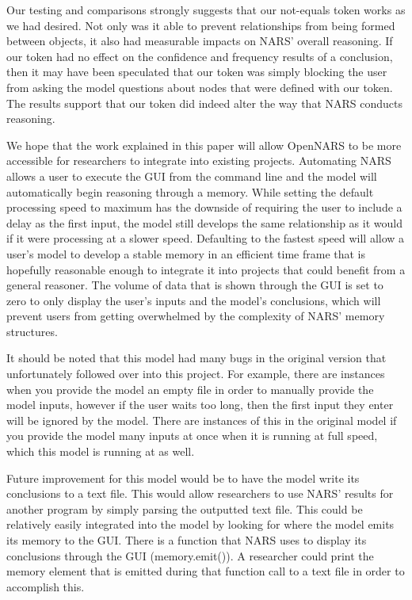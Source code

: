 \documentclass[conference]{IEEEtran}
\begin{document}
	Our testing and comparisons strongly suggests that our not-equals token works as we had desired. Not only was it able to prevent relationships from being formed between objects, it also had measurable impacts on NARS' overall reasoning. If our token had no effect on the confidence and frequency results of a conclusion, then it may have been speculated that our token was simply blocking the user from asking the model questions about nodes that were defined with our token. The results support that our token did indeed alter the way that NARS conducts reasoning. 
	
	We hope that the work explained in this paper will allow OpenNARS to be more accessible for researchers to integrate into existing projects. Automating NARS allows a user to execute the GUI from the command line and the model will automatically begin reasoning through a memory. While setting the default processing speed to maximum has the downside of requiring the user to include a delay as the first input, the model still develops the same relationship as it would if it were processing at a slower speed. Defaulting to the fastest speed will allow a user's model to develop a stable memory in an efficient time frame that is hopefully reasonable enough to integrate it into projects that could benefit from a general reasoner. The volume of data that is shown through the GUI is set to zero to only display the user's inputs and the model's conclusions, which will prevent users from getting overwhelmed by the complexity of NARS' memory structures. 

	It should be noted that this model had many bugs in the original version that unfortunately followed over into this project. For example, there are instances when you provide the model an empty file in order to manually provide the model inputs, however if the user waits too long, then the first input they enter will be ignored by the model. There are instances of this in the original model if you provide the model many inputs at once when it is running at full speed, which this model is running at as well.

	Future improvement for this model would be to have the model write its conclusions to a text file. This would allow researchers to use NARS' results for another program by simply parsing the outputted text file. This could be relatively easily integrated into the model by looking for where the model emits its memory to the GUI. There is a function that NARS uses to display its conclusions through the GUI (memory.emit()). A researcher could print the memory element that is emitted during that function call to a text file in order to accomplish this. 
	
\end{document}
